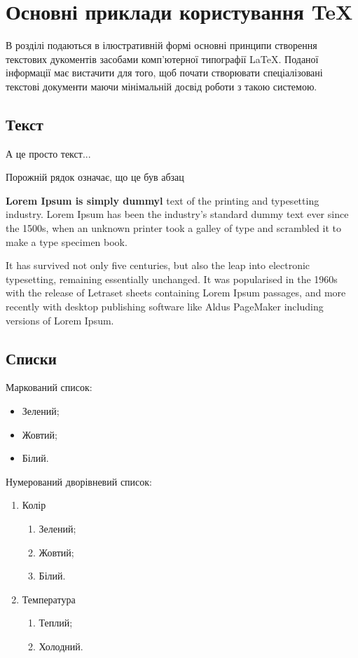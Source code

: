 \chapter{Основні приклади користування {\TeX}}

В розділі подаються в ілюстративній формі основні принципи створення текстових дукоментів засобами комп'ютерної
типографії {\LaTeX}. Поданої інформації має вистачити для того, щоб почати створювати спеціалізовані текстові 
документи маючи мінімальній досвід роботи з такою системою. 

\section{Текст}
А це просто текст...

Порожній рядок означає, що це був абзац

\textbf{Lorem Ipsum is simply dummyl}  text of the printing and typesetting industry. Lorem Ipsum has been the industry's standard dummy text ever since the 1500s, when an unknown printer took a galley of type and scrambled it to make a type specimen book. 

It has survived not only five centuries, but also the leap into electronic typesetting, remaining essentially unchanged. It was popularised in the 1960s with the release of Letraset sheets containing Lorem Ipsum passages, and more recently with desktop publishing software like Aldus PageMaker including versions of Lorem Ipsum. 

\section{Списки}
Маркований список:
\begin{itemize}
\item Зелений;
\item Жовтий;
\item Білий.
\end{itemize}

Нумерований дворівневий список:
\begin{enumerate}
\item Колір
      \begin{enumerate}
      \item Зелений;
      \item Жовтий;
      \item Білий.
      \end{enumerate}	
\item Температура
      \begin{enumerate}
      \item Теплий;
      \item Холодний.
      \end{enumerate}
\end{enumerate}
 

